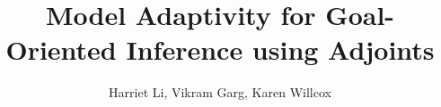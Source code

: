 \documentclass[review]{siamart0516}
\newcommand{\red}[1]{{\color{red}{#1}}}
\begin{document}
\raggedbottom %

\title{Model Adaptivity for Goal-Oriented Inference using Adjoints}

\author{Harriet Li, Vikram Garg, Karen Willcox}
\maketitle

\begin{abstract}

\end{abstract}

\begin{keywords}
  \red{keywords here}
\end{keywords}

\begin{AMS}
  \red{AMS codes here?}
\end{AMS}










\end{document}
